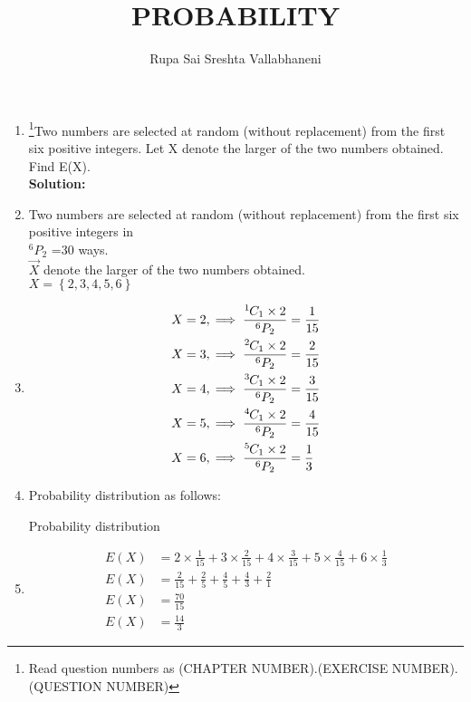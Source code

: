 \documentclass{article}
\providecommand{\cbrak}[1]{\ensuremath{\left\{#1\right\}}}
\newcommand{\solution}{\noindent \textbf{Solution: }}
\newcommand*{\permcomb}[4][0mu]{{{}^{#3}\mkern#1#2_{#4}}}
\newcommand*{\comb}[1][-1mu]{\permcomb[#1]{C}}
\begin{document}
\title{PROBABILITY}
\author{\Large Rupa Sai Sreshta Vallabhaneni}
\date{}
\maketitle
\begin{enumerate}[label=13.\arabic{enumi}.\arabic{enumii}]%
\setcounter{enumi}{3}
\setcounter{enumii}{12}

\item \footnote{Read question numbers as (CHAPTER NUMBER).(EXERCISE NUMBER).(QUESTION NUMBER)}Two numbers are selected at random (without replacement) from the first six positive integers. Let X denote the larger of the two numbers obtained. Find E(X).
\\[1ex]

\solution

\item 
Two numbers are selected at random (without replacement) from the first six positive integers in \\
$^{6}P_2$ =30 ways.\\
$\vec{X}$ denote the larger of the two numbers obtained.\\
$X=\cbrak{2,3,4,5,6}$\\
\item
\begin{align}
X &=2,  \implies
\frac{\comb{1}{1}\times2}{^{6}P_2}  = \frac{1}{15}
\\
X &=3,  \implies
\frac{\comb{2}{1}\times2}{^{6}P_2}  = \frac{2}{15}
\\
X &=4,  \implies
\frac{\comb{3}{1}\times2}{^{6}P_2}  = \frac{3}{15}
\\
X &=5,  \implies
\frac{\comb{4}{1}\times2}{^{6}P_2}  = \frac{4}{15}
\\
X &=6,  \implies
\frac{\comb{5}{1}\times2}{^{6}P_2}  = \frac{1}{3}
\end{align}
\item
Probability distribution as follows:\\
   \begin{table}[h]
	
	\caption{Probability distribution}\label{table:0}
	\end{table}
\item
        \begin{align}
       E(X) &=2\times \frac{1}{15}+3\times \frac{2}{15}+4\times \frac{3}{15}+5\times \frac{4}{15}+6\times \frac{1}{3}
        \\
       E(X) &=\frac{2}{15}+ \frac{2}{5}+ \frac{4}{5}+ \frac{4}{3}+ \frac{2}{1}
        \\
       E(X) &=\frac{70}{15}
        \\
      E(X) &=\frac{14}{3}
        \end{align}
\end{enumerate}
\end{document}
